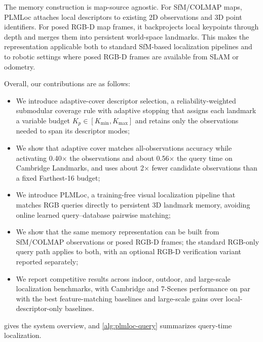 \documentclass[letterpaper,10 pt,conference]{ieeeconf}
\newcommand{\method}{PLMLoc}
\begin{document}
The memory construction is map-source agnostic. For SfM/COLMAP maps, \method{} attaches local descriptors to existing 2D observations and 3D point identifiers. For posed RGB-D map frames, it backprojects local keypoints through depth and merges them into persistent world-space landmarks. This makes the representation applicable both to standard SfM-based localization pipelines and to robotic settings where posed RGB-D frames are available from SLAM or odometry.

Overall, our contributions are as follows:
\begin{itemize}[leftmargin=*,nosep]
\item We introduce adaptive-cover descriptor selection, a reliability-weighted submodular coverage rule with adaptive stopping that assigns each landmark a variable budget $K_p\in[K_{\min},K_{\max}]$ and retains only the observations needed to span its descriptor modes;

\item We show that adaptive cover matches all-observations accuracy while activating 0.40$\times$ the observations and about 0.56$\times$ the query time on Cambridge Landmarks, and uses about 2$\times$ fewer candidate observations than a fixed Farthest-16 budget;

\item We introduce \method{}, a training-free visual localization pipeline that matches RGB queries directly to persistent 3D landmark memory, avoiding online learned query--database pairwise matching;

\item We show that the same memory representation can be built from SfM/COLMAP observations or posed RGB-D frames; the standard RGB-only query path applies to both, with an optional RGB-D verification variant reported separately;

\item We report competitive results across indoor, outdoor, and large-scale localization benchmarks, with Cambridge and 7-Scenes performance on par with the best feature-matching baselines and large-scale gains over local-descriptor-only baselines.

\end{itemize}


 gives the system overview, and \cref{alg:plmloc-query} summarizes query-time localization.
\end{document}
